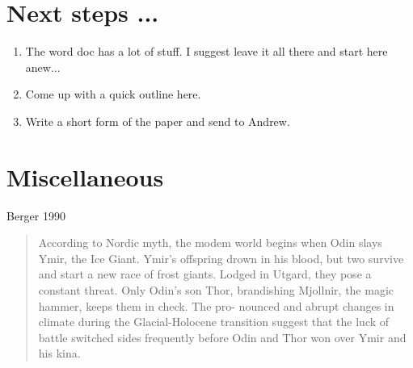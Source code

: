 \documentclass[11pt,letter]{article}
\begin{document}
\section{Next steps ...}
\begin{enumerate}
\item The word doc has a lot of stuff. I suggest leave it all there and start here anew...
\item Come up with a quick outline here.
\item Write a short form of the paper and send to Andrew. 
\end{enumerate}

\section{Miscellaneous}
Berger 1990
\begin{quote}
According to Nordic myth, the modem world begins when Odin slays Ymir, the Ice Giant. Ymir's offspring drown in his blood, but two survive and start a new race of frost giants. Lodged in Utgard, they pose a constant threat. Only Odin's son Thor, brandishing Mjollnir, the magic hammer, keeps them in check. The pro- nounced and abrupt changes in climate during the Glacial-Holocene transition suggest that the luck of battle switched sides frequently before Odin and Thor won over Ymir and his kina.
\end{quote}
\end{document}

